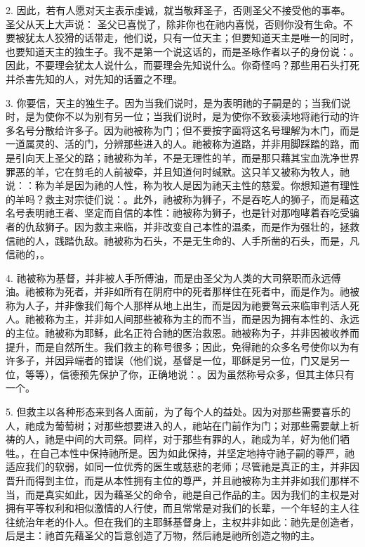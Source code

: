 2. 因此，若有人愿对天主表示虔诚，就当敬拜圣子，否则圣父不接受他的事奉。圣父从天上大声说： 圣父已喜悦了，除非你也在祂内喜悦，否则你没有生命。不要被犹太人狡猾的话带走，他们说，只有一位天主；但要知道天主是唯一的同时，也要知道天主的独生子。我不是第一个说这话的，而是圣咏作者以子的身份说：。因此，不要理会犹太人说什么，而要理会先知说什么。你奇怪吗？那些用石头打死并杀害先知的人，对先知的话置之不理。\par

3. 你要信，天主的独生子。因为当我们说时，是为表明祂的子嗣是的；当我们说时，是为使你不以为别有另一位；当我们说时，是为使你不致亵渎地将祂行动的许多名号分散给许多子。因为祂被称为门；但不要按字面将这名号理解为木门，而是一道属灵的、活的门，分辨那些进入的人。祂被称为道路，并非用脚踩踏的路，而是引向天上圣父的路；祂被称为羊，不是无理性的羊，而是那只藉其宝血洗净世界罪恶的羊，它在剪毛的人前被牵，并且知道何时缄默。这只羊又被称为牧人，祂说：：称为羊是因为祂的人性，称为牧人是因为祂天主性的慈爱。你想知道有理性的羊吗？救主对宗徒们说：。此外，祂被称为狮子，不是吞吃人的狮子，而是藉这名号表明祂王者、坚定而自信的本性：祂被称为狮子，也是针对那咆哮着吞吃受骗者的仇敌狮子。因为救主来临，并非改变自己本性的温柔，而是作为强壮的，拯救信祂的人，践踏仇敌。祂被称为石头，不是无生命的、人手所凿的石头，而是，凡信祂的，。\par

4. 祂被称为基督，并非被人手所傅油，而是由圣父为人类的大司祭职而永远傅油。祂被称为死者，并非如所有在阴府中的死者那样住在死者中，而是作为。祂被称为人子，并非像我们每个人那样从地上出生，而是因为祂要驾云来临审判活人死人。祂被称为主，并非如人间那些被称为主的而不当，而是因为拥有本性的、永远的主位。祂被称为耶稣，此名正符合祂的医治救恩。祂被称为子，并非因被收养而提升，而是自然所生。我们救主的称号很多；因此，免得祂的众多名号使你以为有许多子，并因异端者的错误（他们说，基督是一位，耶稣是另一位，门又是另一位，等等），信德预先保护了你，正确地说：。因为虽然称号众多，但其主体只有一个。\par

5. 但救主以各种形态来到各人面前，为了每个人的益处。因为对那些需要喜乐的人，祂成为葡萄树；对那些想要进入的人，祂站在门前作为门；对那些需要献上祈祷的人，祂是中间的大司祭。同样，对于那些有罪的人，祂成为羊，好为他们牺牲。，在自己本性中保持祂所是。因为如此保持，并坚定地持守祂子嗣的尊严，祂适应我们的软弱，如同一位优秀的医生或慈悲的老师；尽管祂是真正的主，并非因晋升而得到主位，而是从本性拥有主位的尊严，并且祂被称为主并非如我们那样不当，而是真实如此，因为藉圣父的命令，祂是自己作品的主。因为我们的主权是对拥有平等权利和相似激情的人行使，而且常常是对我们的长辈，一个年轻的主人往往统治年老的仆人。但在我们的主耶稣基督身上，主权并非如此：祂先是创造者，后是主：祂首先藉圣父的旨意创造了万物，然后祂是祂所创造之物的主。\par

